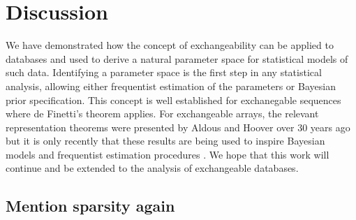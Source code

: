 
\section{Discussion}

We have demonstrated how the concept of exchangeability can be applied to databases and used to derive a natural parameter space for statistical models of such data.
Identifying a parameter space is the first step in any statistical analysis, allowing either frequentist estimation of the parameters or Bayesian prior specification.
This concept is well established for exchanegable sequences where de Finetti's theorem \citep[e.g.][]{Kallenberg2005} applies.
For exchangeable arrays, the relevant representation theorems were presented by Aldous and Hoover \cite{Aldous1981a, Hoover1979} over 30 years ago but it is only recently that these results are being used to inspire Bayesian models \cite{Hoff2007a, Roy2009, Lloyd2012} and frequentist estimation procedures \cite{Kallenberg1999a,Choi2012, Wolfe2013}.
We hope that this work will continue and be extended to the analysis of exchangeable databases.

\subsection{Mention sparsity again}


\outbpdocument{


}
